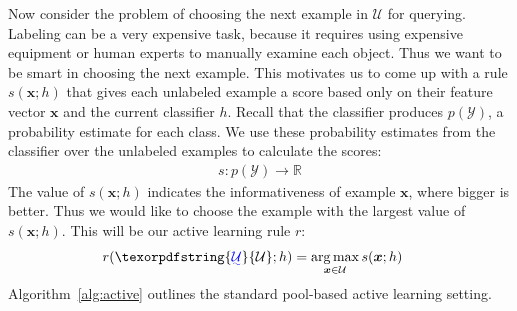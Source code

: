 \documentclass[fleqn,10pt,lineno]{wlpeerj} %
\newcommand{\Y}{\mathcal{Y}}
\newcommand{\Unlabeled}{\mathcal{U}}
\newcommand*{\argmax}{\operatornamewithlimits{arg\,max}\limits}
\providecommand{\DIFaddtex}[1]{{\protect\color{blue}\uwave{#1}}} %
\providecommand{\DIFaddbegin}{} %
\providecommand{\DIFaddend}{} %
\providecommand{\DIFdelbegin}{} %
\providecommand{\DIFdelend}{} %
\providecommand{\DIFadd}[1]{\texorpdfstring{\DIFaddtex{#1}}{#1}} %
\begin{document}
Now consider the problem of choosing the next example in $\Unlabeled$ for
querying. Labeling can be a very expensive task, because it requires using
expensive equipment or human experts to manually examine each object. Thus we
want to be smart in choosing the next example. This motivates us to come up
with a rule $s(\bm{x}; h)$ that gives each unlabeled example a score based only
on their feature vector $\bm{x}$ and the current classifier $h$. Recall that
the classifier produces $p(\Y)$, a probability estimate for each class. We use
these probability estimates from the classifier over the unlabeled examples to
calculate the scores:
\begin{align}
	s : p(\Y) \rightarrow \mathbb{R}
\end{align}
The value of $s(\bm{x}; h)$ indicates the informativeness of example $\bm{x}$,
where bigger is better. Thus we would like to choose the example with the
largest value of $s(\bm{x}; h)$. This will be our active learning rule $r$:
\begin{align}
	r(\DIFdelbegin %
\DIFdelend \DIFaddbegin \DIFadd{\Unlabeled}\DIFaddend ; h) &= \argmax_{\bm{x} \in \Unlabeled} s(\bm{x}; h)
\end{align}
Algorithm~\ref{alg:active} outlines the standard pool-based active learning
setting.
\end{document}
